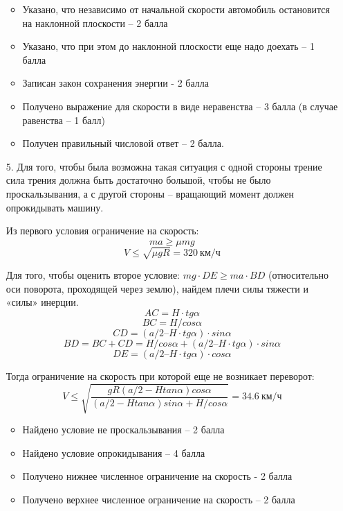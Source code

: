 \begin{enumerate}
    \markSection

    \begin{itemize}
        \item Указано, что независимо от начальной скорости автомобиль остановится на наклонной плоскости – 2 балла
        \item Указано, что при этом до наклонной плоскости еще надо доехать – 1 балла
        \item Записан закон сохранения энергии - 2 балла
        \item Получено выражение для скорости в виде неравенства – 3 балла (в случае равенства – 1 балл)
        \item Получен правильный числовой ответ – 2 балла.
    \end{itemize}

    \item[5.] 	Для того, чтобы была возможна такая ситуация с одной стороны трение сила трения должна быть достаточно большой, чтобы не было проскальзывания, а с другой стороны – вращающий момент должен опрокидывать машину.
    

    Из первого условия ограничение на скорость: 
    $$ma \geq  \mu mg$$
    $$V \leq \sqrt{\mu gR}=320 \: \text{км/ч}$$
    
    Для того, чтобы оценить второе условие:
    $mg \cdot DE \geq ma \cdot BD$ (относительно оси поворота, проходящей через землю),
    найдем плечи силы тяжести и «силы» инерции.
    $$AC = H \cdot tg \alpha $$
    $$BC = H/cos \alpha $$
    $$CD = (a/2 – H \cdot tg \alpha ) \cdot sin \alpha $$
    $$BD = BC + CD = H/cos \alpha  + (a/2 – H \cdot tg \alpha ) \cdot sin \alpha $$
    $$DE = (a/2 – H \cdot tg \alpha ) \cdot cos \alpha $$
    
    Тогда ограничение на скорость при которой еще не возникает переворот:
    $$V \leq \sqrt{\frac{gR(a/2-H tan \alpha )cos \alpha}{(a/2-H tan \alpha )sin \alpha +H/cos \alpha}}=34.6 \: \text{км/ч}$$
    

    \markSection

    \begin{itemize}
        \item Найдено условие не проскальзывания – 2 балла
        \item Найдено условие опрокидывания – 4 балла
        \item Получено нижнее численное ограничение на скорость - 2 балла
        \item Получено верхнее численное ограничение на скорость – 2 балла
    \end{itemize}
\end{enumerate}